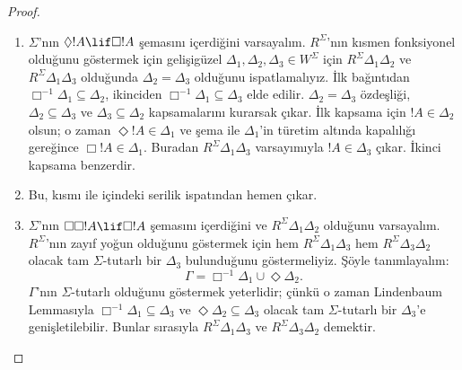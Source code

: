 \documentclass[../../../include/open-logic-section]{subfiles}
\begin{document}
\begin{proof}
  \begin{enumerate}
  \item $\Sigma$'nın $\Diamond!A\lif\Box!A$ şemasını içerdiğini
    varsayalım. $R^\Sigma$'nın kısmen fonksiyonel olduğunu göstermek için
    gelişigüzel $\Delta_1,\Delta_2,\Delta_3\in W^\Sigma$ için
    $R^\Sigma\Delta_1\Delta_2$ ve $R^\Sigma\Delta_1\Delta_3$ olduğunda
    $\Delta_2=\Delta_3$ olduğunu ispatlamalıyız. İlk bağıntıdan
    $\Box^{-1}\Delta_1\subseteq\Delta_2$, ikinciden
    $\Box^{-1}\Delta_1\subseteq\Delta_3$
     elde edilir. $\Delta_2=\Delta_3$ özdeşliği,
    $\Delta_2\subseteq\Delta_3$ ve $\Delta_3\subseteq\Delta_2$
    kapsamalarını kurarsak çıkar. İlk kapsama için $!A\in\Delta_2$ olsun;
    o zaman $\Diamond!A\in\Delta_1$ ve şema ile $\Delta_1$'in türetim
    altında kapalılığı gereğince $\Box!A\in\Delta_1$. Buradan
    $R^\Sigma\Delta_1\Delta_3$ varsayımıyla $!A\in\Delta_3$ çıkar.
    İkinci kapsama benzerdir.

  \item Bu,  kısmı ile
     içindeki serilik ispatından hemen çıkar.

  \item $\Sigma$'nın $\Box\Box!A\lif\Box!A$ şemasını içerdiğini ve
    $R^\Sigma\Delta_1\Delta_2$ olduğunu varsayalım. $R^\Sigma$'nın zayıf
    yoğun olduğunu göstermek için hem $R^\Sigma\Delta_1\Delta_3$ hem
    $R^\Sigma\Delta_3\Delta_2$ olacak tam $\Sigma$-tutarlı bir $\Delta_3$
    bulunduğunu göstermeliyiz. Şöyle tanımlayalım:
    \[
    \Gamma=\Box^{-1}\Delta_1\cup\Diamond\Delta_2.
    \]
    $\Gamma$'nın $\Sigma$-tutarlı olduğunu göstermek yeterlidir; çünkü o
    zaman Lindenbaum Lemmasıyla $\Box^{-1}\Delta_1\subseteq\Delta_3$ ve
    $\Diamond\Delta_2\subseteq\Delta_3$ olacak tam $\Sigma$-tutarlı bir
    $\Delta_3$'e genişletilebilir. Bunlar sırasıyla
    $R^\Sigma\Delta_1\Delta_3$
     ve
    $R^\Sigma\Delta_3\Delta_2$
     demektir.


\end{enumerate}
\end{proof}
\end{document}
